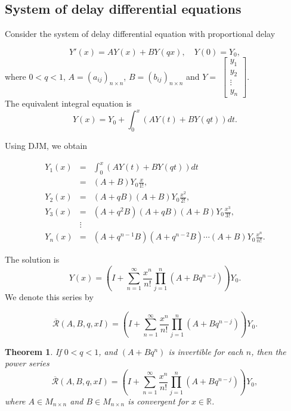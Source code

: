 \documentclass[12pt]{article}
\newtheorem{The}{Theorem}[section]
\numberwithin{equation}{section}
\begin{document}
\subsection{System of delay differential equations}
Consider the system of delay differential equation with proportional delay 

\begin{equation}
Y'(x) = AY(x)+ BY(q x),\quad Y(0)= Y_0, \label{7.2.1}
\end{equation}
where  $0<q<1$, $A=\left(a_{ij}\right)_{n\times n}$, $B=\left(b_{ij}\right)_{n\times n}$ and $Y=$
$
\begin{bmatrix}
y_1\\
y_2\\
\vdots\\
y_n
\end{bmatrix}.
$\\
The equivalent integral equation is 
\begin{equation}
Y(x)= Y_0 + \int_{0}^{x}\left( AY(t)+ BY(qt)\right)dt.\label{7.2.2}
\end{equation}

Using DJM, we obtain

\begin{eqnarray}
Y_1(x)&=& \int_{0}^{x}\left( AY(t)+ BY(qt)\right)dt\nonumber\\
&=& (A+B)Y_0\frac{x}{1!},\nonumber\\
Y_2(x)&=& (A+qB)(A+B)Y_0 \frac{x^2}{2!},\nonumber\\
Y_3(x)&=& (A+q^2B)(A+qB)(A+B)Y_0 \frac{x^3}{3!},\nonumber\\
&\vdots& \nonumber\\
Y_n(x)&=& (A+q^{n-1}B)(A+q^{n-2}B)\cdots (A+B)Y_0 \frac{x^n}{n!}. 
\end{eqnarray}

The solution is 
\begin{equation}
Y(x) = \left( I  + \sum_{n=1}^\infty \frac{x^n}{n!}\prod_{j=1}^{n}\left(A+Bq^{n-j}\right)\right)Y_0.\label{7.2.3}
\end{equation}
We denote this series by

\begin{equation}
\overline{\mathcal{R}}(A, B, q, xI) = \left( I  + \sum_{n=1}^\infty \frac{x^n}{n!}\prod_{j=1}^{n}\left(A+Bq^{n-j}\right)\right)Y_0.
\end{equation}

\begin{The}
If $0<q<1$, and $(A+Bq^n)$ is invertible for each $n$, then the  power series 
\begin{equation}
\overline{\mathcal{R}}(A, B, q, xI) = \left( I  + \sum_{n=1}^\infty \frac{x^n}{n!}\prod_{j=1}^{n}\left(A+Bq^{n-j}\right)\right)Y_0,\label{7.2.4}
\end{equation}
where $A\in M_{n\times n}$ and $B\in M_{n\times n}$ is  convergent for $x\in\mathbb{R}$.
\end{The}
\end{document}
